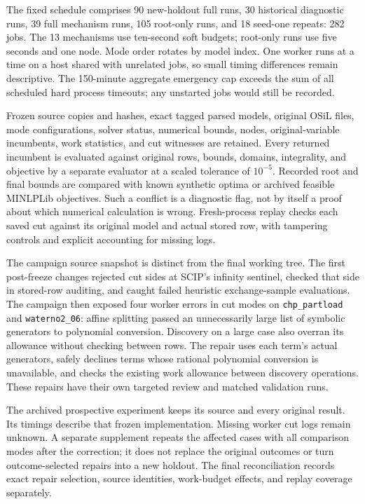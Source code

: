 The fixed schedule comprises 90 new-holdout full runs, 30 historical
diagnostic runs, 39 full mechanism runs, 105 root-only runs, and 18
seed-one repeats: 282 jobs. The 13 mechanisms use ten-second soft
budgets; root-only runs use five seconds and one node. Mode order rotates
by model index. One worker runs at a time on a host shared with unrelated
jobs, so small timing differences remain descriptive. The 150-minute
aggregate emergency cap exceeds the sum of all scheduled hard process
timeouts; any unstarted jobs would still be recorded.

Frozen source copies and hashes, exact tagged parsed models, original
OSiL files, mode configurations, solver status, numerical bounds, nodes,
original-variable incumbents, work statistics, and cut witnesses are
retained. Every returned incumbent is evaluated against original rows,
bounds, domains, integrality, and objective by a separate evaluator at a
scaled tolerance of $10^{-5}$. Recorded root and final bounds are compared
with known synthetic optima or archived feasible MINLPLib objectives.
Such a conflict is a diagnostic flag, not by itself a proof about which
numerical calculation is wrong. Fresh-process replay checks each saved
cut against its original model and actual stored row, with tampering
controls and explicit accounting for missing logs.

The campaign source snapshot is distinct from the final working tree.
The first post-freeze changes rejected cut sides at SCIP's infinity
sentinel, checked that side in stored-row auditing, and caught failed
heuristic exchange-sample evaluations. The campaign then exposed four
worker errors in cut modes on \texttt{chp\_partload} and
\texttt{waterno2\_06}: affine splitting passed an unnecessarily large
list of symbolic generators to polynomial conversion. Discovery on a
large case also overran its allowance without checking between rows.
The repair uses each term's actual generators, safely declines terms
whose rational polynomial conversion is unavailable, and checks the
existing work allowance between discovery operations. These repairs have
their own targeted review and matched validation runs.

The archived prospective experiment keeps its source and every original
result. Its timings describe that frozen implementation. Missing worker
cut logs remain unknown. A separate supplement repeats the affected
cases with all comparison modes after the correction; it does not replace
the original outcomes or turn outcome-selected repairs into a new holdout.
The final reconciliation records exact repair selection, source identities,
work-budget effects, and replay coverage separately.


